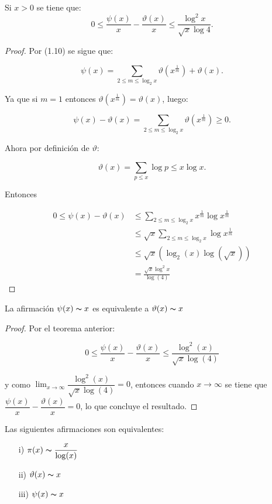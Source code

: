 \begin{theorem}
    Si $x>0$ se tiene que:
$$
0 \leq \frac{\psi(x)}{x}-\frac{\vartheta(x)}{x} \leq \frac{\log ^2 x}{\sqrt{x} \log 4} .
$$
\end{theorem}


\begin{proof}

Por (1.10) se sigue que:

    $$
\psi(x)=\sum_{2 \leq m \leq \log _2 x} \vartheta\left(x^{\frac{1}{m}}\right)+\vartheta(x) .
$$

Ya que si $m=1$ entonces $\vartheta(x^{\frac{1}{m}})=\vartheta(x)$, luego:

$$
\psi(x)-\vartheta(x)=\sum_{2 \leq m \leq \log _2 x} \vartheta\left(x^{\frac{1}{m}}\right)\geq  0.
$$

Ahora por definición de $\vartheta:$

$$
\vartheta(x)=\sum_{p \leq x} \log p\leq x \log x .
$$

Entonces

\begin{align*}
    0 \leq \psi(x)-\vartheta(x) &\leq \sum_{2 \leq m \leq \log _2 x} x^{\frac{1}{m}} \log x^{\frac{1}{m}} \\
    &\leq \sqrt{x} \sum_{2 \leq m \leq \log _2 x} \log x^{\frac{1}{m}}\\
    &\leq \sqrt{x}(\log_2(x)\log(\sqrt{x}))\\
    &=\frac{\sqrt{x}\log^2 x}{\log(4)}
\end{align*}
\end{proof}

\begin{theorem}
    La afirmación $\psi(x)\thicksim x$ es equivalente a $\vartheta(x)\thicksim x$
\end{theorem}

\begin{proof}
    Por el teorema anterior:

    $$0\leq \dfrac{\psi(x)}{x}-\dfrac{\vartheta(x)}{x}\leq \dfrac{\log^2(x)}{\sqrt{x}\log(4)}$$

    y como $\lim_{x\to \infty} \dfrac{\log^2(x)}{\sqrt{x}\log(4)}=0$, entonces cuando $x\to \infty$ se tiene que $\dfrac{\psi(x)}{x}-\dfrac{\vartheta(x)}{x}=0$, lo que concluye el resultado.
\end{proof}


\begin{theorem}
\label{equivalencia tnp}
    Las siguientes afirmaciones son equivalentes:
    \begin{itemize}
        \item[i)] $\pi(x)\thicksim \dfrac{x}{\log(x)}$

        \item [ii)] $\vartheta(x)\thicksim x$

        \item[iii)] $\psi(x)\thicksim x$
    \end{itemize}    
\end{theorem}

